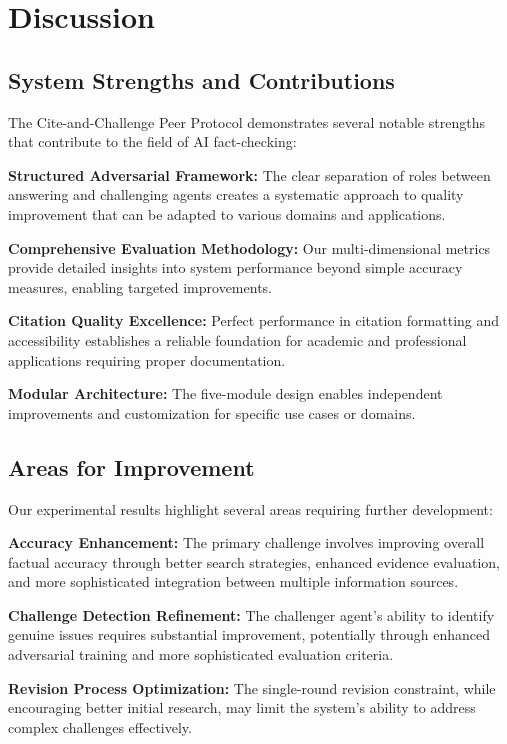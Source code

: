 \documentclass{article}
\begin{document}
\section{Discussion}

\subsection{System Strengths and Contributions}

The Cite-and-Challenge Peer Protocol demonstrates several notable strengths that contribute to the field of AI fact-checking:

\textbf{Structured Adversarial Framework:} The clear separation of roles between answering and challenging agents creates a systematic approach to quality improvement that can be adapted to various domains and applications.

\textbf{Comprehensive Evaluation Methodology:} Our multi-dimensional metrics provide detailed insights into system performance beyond simple accuracy measures, enabling targeted improvements.

\textbf{Citation Quality Excellence:} Perfect performance in citation formatting and accessibility establishes a reliable foundation for academic and professional applications requiring proper documentation.

\textbf{Modular Architecture:} The five-module design enables independent improvements and customization for specific use cases or domains.

\subsection{Areas for Improvement}

Our experimental results highlight several areas requiring further development:

\textbf{Accuracy Enhancement:} The primary challenge involves improving overall factual accuracy through better search strategies, enhanced evidence evaluation, and more sophisticated integration between multiple information sources.

\textbf{Challenge Detection Refinement:} The challenger agent's ability to identify genuine issues requires substantial improvement, potentially through enhanced adversarial training and more sophisticated evaluation criteria.

\textbf{Revision Process Optimization:} The single-round revision constraint, while encouraging better initial research, may limit the system's ability to address complex challenges effectively.
\end{document}
